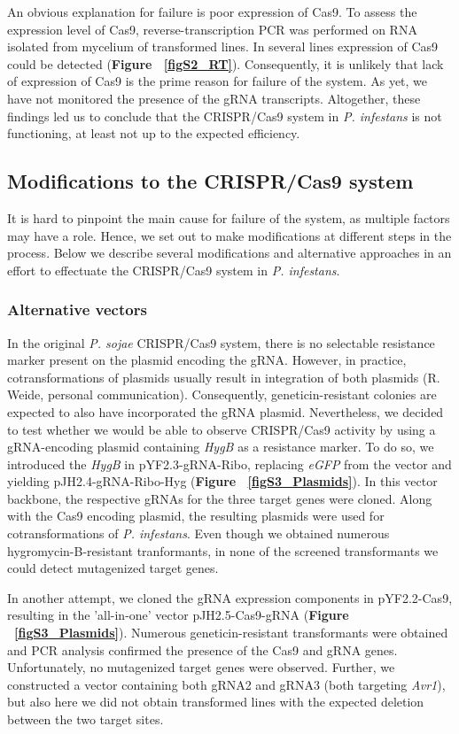 \documentclass[onecolumn, 11pt,openany]{memoir}
\begin{document}
\begin{multicols}{2}
An obvious explanation for failure is poor expression of Cas9. To assess the expression level of Cas9, reverse-transcription PCR was performed on RNA isolated from mycelium of transformed lines. In several lines expression of Cas9 could be detected (\textbf{Figure ~\ref{figS2_RT}}). Consequently, it is unlikely that lack of expression of Cas9 is the prime reason for failure of the system. As yet, we have not monitored the presence of the gRNA transcripts. Altogether, these findings led us to conclude that the CRISPR/Cas9 system in \textit{P. infestans }is not functioning, at least not up to the expected efficiency.

\subsection{Modifications to the CRISPR/Cas9 system}
It is hard to pinpoint the main cause for failure of the system, as multiple factors may have a role. Hence, we set out to make modifications at different steps in the process. Below we describe several modifications and alternative approaches in an effort to effectuate the CRISPR/Cas9 system in \textit{P. infestans}.  

\subsubsection{Alternative vectors}
In the original \textit{P. sojae }CRISPR/Cas9 system, there is no selectable resistance marker present on the plasmid encoding the gRNA. However, in practice, cotransformations of plasmids usually result in integration of both plasmids (R. Weide, personal communication). Consequently, geneticin-resistant colonies are expected to also have incorporated the gRNA plasmid. Nevertheless, we decided to test whether we would be able to observe CRISPR/Cas9 activity by using a gRNA-encoding plasmid containing \textit{HygB }as a resistance marker. To do so, we introduced the \textit{HygB} in pYF2.3-gRNA-Ribo, replacing \textit{eGFP} from the vector and yielding pJH2.4-gRNA-Ribo-Hyg (\textbf{Figure ~\ref{figS3_Plasmids}}). In this vector backbone, the respective gRNAs for the three target genes were cloned. Along with the Cas9 encoding plasmid, the resulting plasmids were used for cotransformations of \textit{P. infestans}. Even though we obtained numerous hygromycin-B-resistant tranformants, in none of the screened transformants we could detect mutagenized target genes.

In another attempt, we cloned the gRNA expression components in pYF2.2-Cas9, resulting in the 'all-in-one' vector pJH2.5-Cas9-gRNA (\textbf{Figure ~\ref{figS3_Plasmids}}). Numerous geneticin-resistant transformants were obtained and PCR analysis confirmed the presence of the Cas9 and gRNA genes. Unfortunately, no mutagenized target genes were observed. Further, we constructed a vector containing both gRNA2 and gRNA3 (both targeting \textit{Avr1}), but also here we did not obtain transformed lines with the expected deletion between the two target sites. 


\end{multicols}
\end{document}

